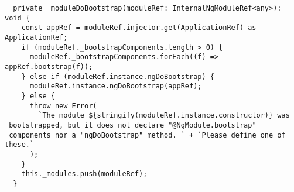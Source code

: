 \begin{verbatim}
  private _moduleDoBootstrap(moduleRef: InternalNgModuleRef<any>): void {
    const appRef = moduleRef.injector.get(ApplicationRef) as ApplicationRef;
    if (moduleRef._bootstrapComponents.length > 0) {
      moduleRef._bootstrapComponents.forEach((f) => appRef.bootstrap(f));
    } else if (moduleRef.instance.ngDoBootstrap) {
      moduleRef.instance.ngDoBootstrap(appRef);
    } else {
      throw new Error(
        `The module ${stringify(moduleRef.instance.constructor)} was
 bootstrapped, but it does not declare "@NgModule.bootstrap"
 components nor a "ngDoBootstrap" method. ` + `Please define one of these.`
      );
    }
    this._modules.push(moduleRef);
  }
\end{verbatim}
